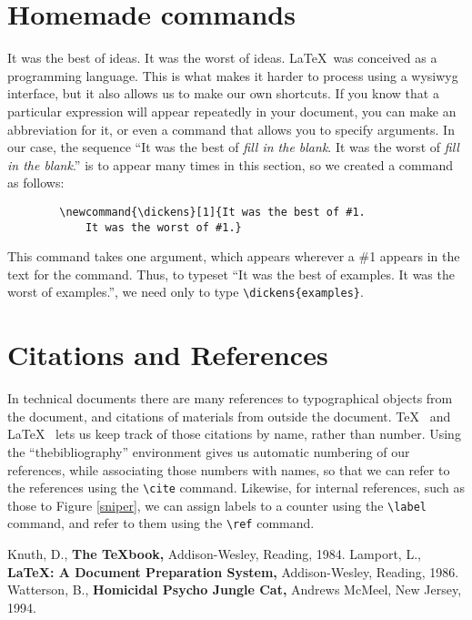 \documentclass[UTF8]{article}
\begin{document}
	\section{Homemade commands}
	\newcommand{\dickens}[1]{It was the best of #1. It was the worst of #1.}
	\dickens{ideas}
	\LaTeX\ was conceived as a programming language.  This is what makes it
	harder to process using a wysiwyg interface, but it also allows
	us to make our own shortcuts.
	If you know that a particular expression will appear repeatedly
	in your document, you can make an abbreviation for it, or even
	a command that allows you to specify arguments.  In our case,
	the sequence ``\dickens{{\it fill in the blank}}''
	is to appear many times in this section, so we created a command
	as follows:
	\begin{verbatim}
		\newcommand{\dickens}[1]{It was the best of #1. 
			It was the worst of #1.}
	\end{verbatim}
	This command takes one argument, which appears wherever a \#1 appears
	in the text for the command.  Thus, to typeset ``\dickens{examples}'',
	we need only to type \verb(\dickens{examples}(.
	
	\section{Citations and References}
	In technical documents there are many references to 
	typographical objects from the document, and citations
	of materials from outside the document.  \TeX\ \cite{knuth}
	and \LaTeX\ \cite{lamport} lets us keep track of those citations
	by name, rather than number.  Using the ``thebibliography'' 
	environment gives us automatic numbering of our references,
	while associating those numbers with names, so that we can
	refer to the references using the \verb(\cite( command.
	Likewise, for internal references, such as those to Figure \ref{sniper},
	we can assign labels to a counter using the \verb(\label(
	command, and refer to them using the \verb(\ref( command.
	
	\begin{thebibliography}{X}
		 Knuth, D., {\bf The \TeX book,} Addison-Wesley, Reading, 1984.
		 Lamport, L., {\bf \LaTeX: A Document Preparation System,}
		Addison-Wesley, Reading, 1986.
		 Watterson, B., {\bf Homicidal Psycho Jungle Cat,}
		Andrews McMeel, New Jersey, 1994.
	\end{thebibliography}
\end{document}
